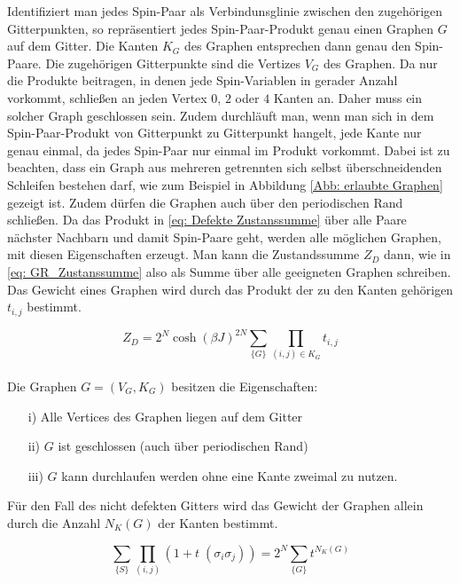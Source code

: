 \noindent Identifiziert man jedes Spin-Paar als Verbindunsglinie zwischen den zugehörigen Gitterpunkten, so repräsentiert jedes Spin-Paar-Produkt genau einen Graphen $G$ auf dem Gitter. Die Kanten $K_G$ des Graphen entsprechen dann genau den Spin-Paare. Die zugehörigen Gitterpunkte sind die Vertizes $V_G$ des Graphen. Da nur die Produkte beitragen, in denen jede Spin-Variablen in gerader Anzahl vorkommt, schließen an jeden Vertex $0$, $2$ oder $4$ Kanten an. Daher muss ein solcher Graph geschlossen sein. Zudem durchläuft man, wenn man sich in dem Spin-Paar-Produkt von Gitterpunkt zu Gitterpunkt hangelt, jede Kante nur genau einmal, da jedes Spin-Paar nur einmal im Produkt vorkommt. Dabei ist zu beachten, dass ein Graph aus mehreren getrennten sich selbst überschneidenden Schleifen bestehen darf, wie zum Beispiel in Abbildung \ref{Abb: erlaubte Graphen} gezeigt ist. Zudem dürfen die Graphen auch über den periodischen Rand schließen. 
Da das Produkt in \eqref{eq: Defekte Zustanssumme} über alle Paare nächster Nachbarn und damit Spin-Paare geht, werden alle möglichen Graphen, mit diesen Eigenschaften erzeugt. Man kann die Zustandssumme $Z_D$ dann, wie in \eqref{eq: GR_Zustanssumme} also als Summe über alle geeigneten Graphen schreiben. 
Das Gewicht eines Graphen wird durch das Produkt der zu den Kanten gehörigen $t_{i,j}$ bestimmt.  

\begin{grayframe}[frametitle = {Graphische Representation der Summe $Z_D$} ]
\begin{equation} \label{eq: GR_Zustanssumme}
Z_D = 2^N \cosh(\beta J)^{2N} \sum_{\{G\}} \prod_{(i,j)\in K_{G}} t_{i,j}
\end{equation} 
\\
Die Graphen $G = (V_G, K_G)$ besitzen die Eigenschaften: 
\begin{itemize}
\item[i)] Alle Vertices des Graphen liegen auf dem Gitter
\item[ii)] $G$ ist geschlossen (auch über periodischen Rand)
\item[iii)] $G$ kann durchlaufen werden ohne eine Kante zweimal zu nutzen. 
\end{itemize}
\end{grayframe}

\noindent Für den Fall des nicht defekten Gitters wird das Gewicht der Graphen allein durch die Anzahl $N_K(G)$ der Kanten bestimmt.

\begin{equation} \label{eq: GR_pseudo_ustandssumme}
\sum_{\{S\}} \prod_{(i,j)} (1 +  t \; (\sigma_i \sigma_j)) = 2^N \sum_{\{ G\}} t^{N_K(G)}
\end{equation}


